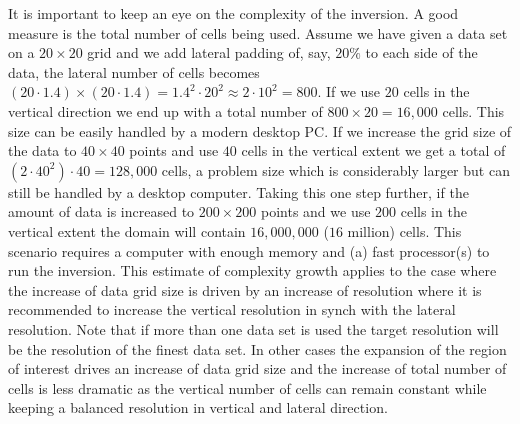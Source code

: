 It is important to keep an eye on the complexity of the inversion.
A good measure is the total number of cells being used.
Assume we have given a data set on a $20 \times 20$ grid and we add lateral
padding of, say, $20 \%$ to each side of the data, the lateral number of cells
becomes $(20\cdot 1.4)\times (20\cdot 1.4)=1.4^2\cdot 20^2\approx 2\cdot 10^2=800$.
If we use $20$ cells in the vertical direction we end up with a total number
of $800 \times 20 = 16,000$ cells.
This size can be easily handled by a modern desktop PC.
If we increase the grid size of the data to $40 \times 40$ points and use $40$
cells in the vertical extent we get a total of $(2\cdot 40^2)\cdot 40=128,000$
cells, a problem size which is considerably larger but can still be handled by
a desktop computer.
Taking this one step further, if the amount of data is increased to
$200\times 200$ points and we use $200$ cells in the vertical extent the
domain will contain $16,000,000$ ($16$ million) cells.
This scenario requires a computer with enough memory and (a) fast processor(s)
to run the inversion.
This estimate of complexity growth applies to the case where the increase
of data grid size is driven by an increase of resolution where it is
recommended to increase the vertical resolution in synch with the lateral
resolution. Note that if more than one data set is used the target resolution
will be the resolution of the finest data set.
In other cases the expansion of the region of interest drives an increase of
data grid size and the increase of total number of cells is less dramatic as
the vertical number of cells can remain constant while keeping a balanced
resolution in vertical and lateral direction.

